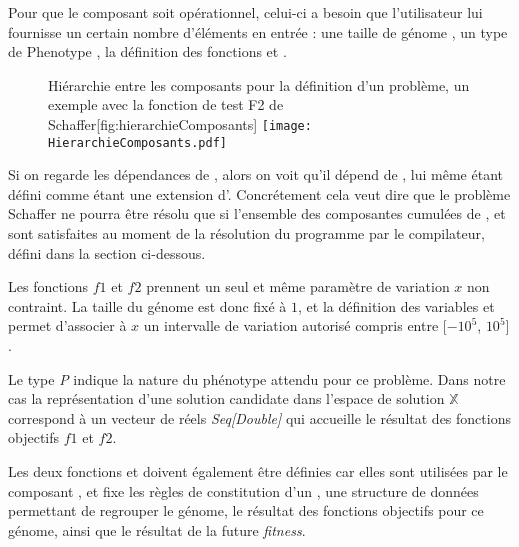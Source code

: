 Pour que le composant  soit opérationnel, celui-ci a besoin que l'utilisateur lui fournisse un certain nombre d'éléments en entrée : une taille de génome , un type de Phenotype , la définition des fonctions  et .

\begin{figure}[ht]
	\begin{sidecaption}{Hiérarchie entre les composants pour la définition d'un problème, un exemple avec la fonction de test F2 de Schaffer}[fig:hierarchieComposants]
	 \centering
	 	\texttt{[image: HierarchieComposants.pdf]}
	\end{sidecaption}
\end{figure}

Si on regarde les dépendances de , alors on voit qu'il dépend de , lui même étant défini comme étant une extension d'. Concrétement cela veut dire que le problème Schaffer ne pourra être résolu que si l'ensemble des composantes cumulées de  ,  et  sont satisfaites au moment de la résolution du programme par le compilateur, défini dans la section ci-dessous.

Les fonctions $f1$ et $f2$ prennent un seul et même paramètre de variation $x$ non contraint. La taille  du génome est donc fixé à $1$, et la définition des variables  et  permet d'associer à $x$ un intervalle de variation autorisé compris entre $[-10^{5}$, $10^{5}]$.

Le type \emph{P} indique la nature du phénotype attendu pour ce problème. Dans notre cas la représentation d'une solution candidate dans l'espace de solution $\mathbb{X}$ correspond à un vecteur de réels \emph{Seq[Double]} qui accueille le résultat des fonctions objectifs $f1$ et $f2$.

Les deux fonctions  et  doivent également être définies car elles sont utilisées par le composant , et fixe les règles de constitution d'un , une structure de données permettant de regrouper le génome, le résultat des fonctions objectifs pour ce génome, ainsi que le résultat de la future \textit{fitness}.

